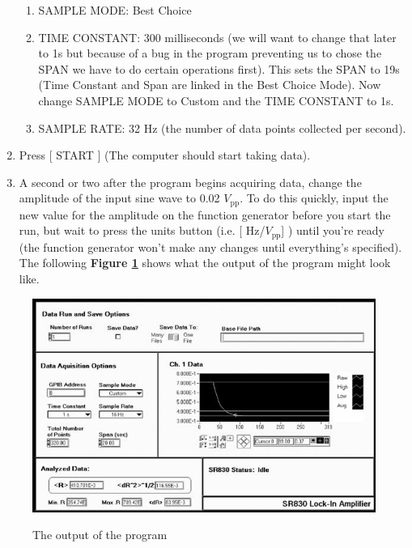 \documentclass{../lab}
\begin{document}
\begin{enumerate}
\begin{enumerate}
        \item SAMPLE MODE: Best Choice

        \item TIME CONSTANT: 300 milliseconds (we will want to change that later to 1s but because of a bug in the program preventing us to chose the SPAN we have to do certain operations first). This sets the SPAN to 19s (Time Constant and Span are linked in the Best Choice Mode). Now change SAMPLE MODE to Custom and the TIME CONSTANT to 1s.

        \item SAMPLE RATE: 32 Hz (the number of data points collected per second).

    \end{enumerate}

    \item Press [ START ] (The computer should start taking data).

    \item A second or two after the program begins acquiring data, change the amplitude of the input sine wave to 0.02 $V_\text{pp}$. To do this quickly, input the new value for the amplitude on the function generator before you start the run, but wait to press the units button (i.e. [ Hz/$V_\text{pp}$] ) until you're ready (the function generator won't make any changes until everything's specified). The following \textbf{Figure \ref{fig:LLSimage013}} shows what the output of the program might look like.

\end{enumerate}


\begin{figure}[h]
    \centering
    \href{http://experimentationlab.berkeley.edu/sites/default/files/images/LLSimage013.jpg}{\includegraphics[width=0.6\linewidth]{images/LLSimage013.jpg}}
    \caption{The output of the program}
    \label{fig:LLSimage013}
\end{figure}
\end{document}
